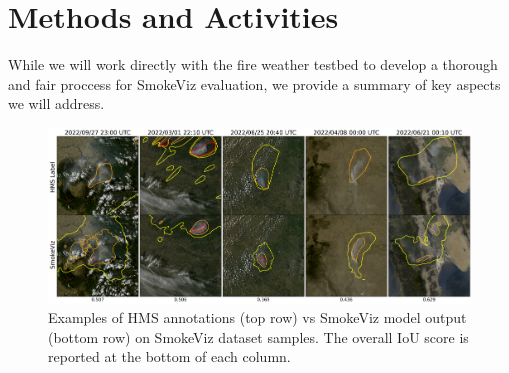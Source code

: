 \section{Methods and Activities}

While we will work directly with the fire weather testbed to develop a thorough and fair proccess for SmokeViz evaluation, we provide a summary of key aspects we will address.


\begin{figure}
    \centering
    \includegraphics[width=17cm]{figures/examples.png}
    \caption{Examples of HMS annotations (top row) vs SmokeViz model output (bottom row) on SmokeViz dataset samples. The overall IoU score is reported at the bottom of each column.}\label{examples}
\end{figure}


